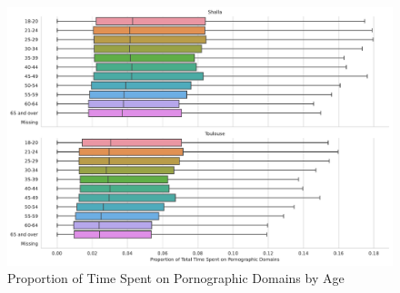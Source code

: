 \documentclass[12pt, letterpaper]{article}
\begin{document}
\begin{figure}[!htb]
	\centering
	\caption{Proportion of Time Spent on Pornographic Domains by Age}
	\label{fig:prop_time_porn_age}
	\includegraphics[width=\textwidth]{figs/prop_total_time_porn_age.pdf}
\end{figure}
\end{document}
